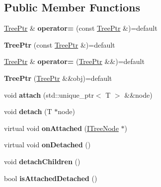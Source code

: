 \subsection*{Public Member Functions}
\begin{DoxyCompactItemize}
\item 
\mbox{\label{classflw_1_1flf_1_1TreePtr_a1391b85aded5a02b3eaf49276354f20d}} 
\hyperlink{classflw_1_1flf_1_1TreePtr}{Tree\+Ptr} \& {\bfseries operator=} (const \hyperlink{classflw_1_1flf_1_1TreePtr}{Tree\+Ptr} \&)=default
\item 
\mbox{\label{classflw_1_1flf_1_1TreePtr_a342479c2abb2dd8861bc358db1728e20}} 
{\bfseries Tree\+Ptr} (const \hyperlink{classflw_1_1flf_1_1TreePtr}{Tree\+Ptr} \&)=default
\item 
\mbox{\label{classflw_1_1flf_1_1TreePtr_a4d6bb09d0daf4784fbfc5892ccf229d8}} 
\hyperlink{classflw_1_1flf_1_1TreePtr}{Tree\+Ptr} \& {\bfseries operator=} (\hyperlink{classflw_1_1flf_1_1TreePtr}{Tree\+Ptr} \&\&)=default
\item 
\mbox{\label{classflw_1_1flf_1_1TreePtr_ae490a01d5a3b41c8ff69b902f530429c}} 
{\bfseries Tree\+Ptr} (\hyperlink{classflw_1_1flf_1_1TreePtr}{Tree\+Ptr} \&\&obj)=default
\item 
\mbox{\label{classflw_1_1flf_1_1TreePtr_afddb82f8fd20632610e951f55b2528bf}} 
void {\bfseries attach} (std\+::unique\+\_\+ptr$<$ T $>$ \&\&node)
\item 
\mbox{\label{classflw_1_1flf_1_1TreePtr_aeb59cfe99394f4b3a98abeb5d2ad2021}} 
void {\bfseries detach} (T $\ast$node)
\item 
\mbox{\label{classflw_1_1flf_1_1TreePtr_a9f6fd4ca7f98953523a41741699e6697}} 
virtual void {\bfseries on\+Attached} (\hyperlink{classflw_1_1flf_1_1ITreeNode}{I\+Tree\+Node} $\ast$)
\item 
\mbox{\label{classflw_1_1flf_1_1TreePtr_a3b46ca5d542a91fe8f4b6287795e1f1c}} 
virtual void {\bfseries on\+Detached} ()
\item 
\mbox{\label{classflw_1_1flf_1_1TreePtr_a7f65d157133d4596d40bf58ebddb29d3}} 
void {\bfseries detach\+Children} ()
\item 
\mbox{\label{classflw_1_1flf_1_1TreePtr_adebf899fb4768f1b7b9c473162e48409}} 
bool {\bfseries is\+Attached\+Detached} ()
\end{DoxyCompactItemize}
